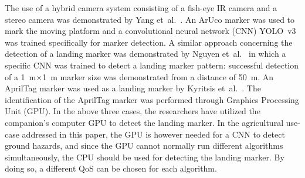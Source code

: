 \documentclass[conference, onecolumn, draftclsnofoot]{IEEEtran}
\begin{document}




The use of a hybrid camera system consisting of a fish-eye IR camera
and a stereo camera was demonstrated by Yang
et~al.~\cite{yang2018hybrid}. An ArUco marker was used to mark the
moving platform and a convolutional neural network (CNN) YOLO~v3 was
trained specifically for marker detection. A similar approach
concerning the detection of a landing marker was demonstrated by
Nguyen et~al.~\cite{nguyen2018lightdenseyolo} in which a specific CNN was trained to detect a landing marker pattern: successful
detection of a \SI{1}{\m}$\times$\SI{1}{\m} marker size was demonstrated from a
distance of \SI{50}{\m}. An AprilTag marker was used as a landing marker by
Kyritsis et~al.~\cite{kyristsis2016towards}. The identification of the AprilTag marker
was performed through Graphics Processing Unit (GPU). In the above three cases, the researchers
have utilized the companion's computer GPU to detect the landing
marker. In the agricultural use-case addressed in this paper, the GPU
is however needed for a CNN to detect ground hazards, and since the
GPU cannot normally run different algorithms simultaneously,
%
%
the CPU should be used for detecting the landing marker. By doing so,
a different QoS can be chosen for each algorithm.  

\end{document}
